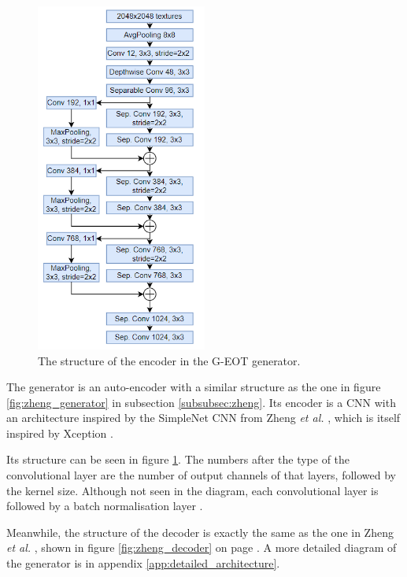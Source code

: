 \begin{figure}
    \centering
    \includegraphics[width=0.5\textwidth]{graphics/g-eot-encoder.PNG}
    \caption{The structure of the encoder in the G-EOT generator.}
    \label{fig:proposed_encoder}
\end{figure}

The generator is an auto-encoder with a similar structure as the one in figure \ref{fig:zheng_generator} in subsection \ref{subsubsec:zheng}. Its encoder is a CNN with an architecture inspired by the SimpleNet CNN from Zheng \textit{et al.} \cite{zheng_black_box_GAN}, which is itself inspired by Xception \cite{xception}. 

Its structure can be seen in figure \ref{fig:proposed_encoder}. The numbers after the type of the convolutional layer are the number of output channels of that layers, followed by the kernel size. Although not seen in the diagram, each convolutional layer is followed by a batch normalisation layer \cite{batch_norm}.

Meanwhile, the structure of the decoder is exactly the same as the one in Zheng \textit{et al.} \cite{zheng_black_box_GAN}, shown in figure \ref{fig:zheng_decoder} on page \pageref{fig:zheng_decoder}. A more detailed diagram of the generator is in appendix \ref{app:detailed_architecture}.

